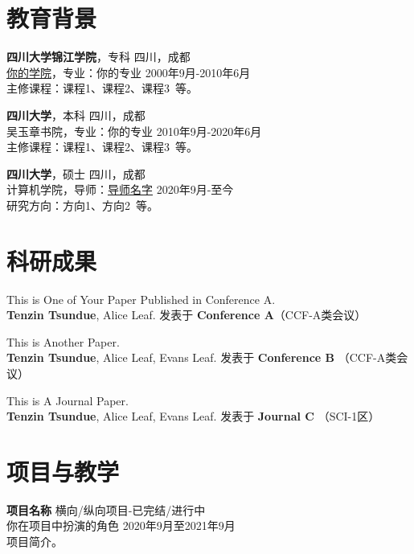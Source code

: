 \section{\makebox[\widthof{\faGraduationCap}][c]{\color{SCU_Red}{\faGraduationCap}}\quad 教育背景}
{\large \textbf{四川大学锦江学院}}，专科 \hfill {四川，成都} \\
\href{https://www.scu.edu.cn/}{你的学院}，专业：你的专业 \hfill {2000年9月-2010年6月} \\
主修课程：课程1、课程2、课程3\ 等。

\vspace{0.5em}
{\large \textbf{四川大学}}，本科 \hfill {四川，成都} \\
{{吴玉章书院}}，专业：你的专业 \hfill {2010年9月-2020年6月} \\
主修课程：课程1、课程2、课程3\ 等。

\vspace{0.5em}
{\large \textbf{四川大学}}，硕士 \hfill {四川，成都} \\
计算机学院，导师：\href{导师的个人主页.site}{导师名字} \hfill {2020年9月-至今} \\
研究方向：方向1、方向2\ 等。

\section{\makebox[\widthof{\faGraduationCap}][c]{\color{SCU_Red}{\faGraduationCap}}\quad 科研成果}
This is One of Your Paper Published in Conference A. \\
\textbf{Tenzin Tsundue}, Alice Leaf. \hfill 发表于 \textbf{Conference A}（CCF-A类会议） 

\vspace{0.5em}
This is Another Paper. \\
\textbf{Tenzin Tsundue}, Alice Leaf, Evans Leaf. \hfill 发表于 \textbf{Conference B} （CCF-A类会议）

\vspace{0.5em}
This is A Journal Paper. \\
\textbf{Tenzin Tsundue}, Alice Leaf, Evans Leaf. \hfill 发表于 \textbf{Journal C} （SCI-1区）

\section{\makebox[\widthof{\faChalkboardTeacher}][c]{\color{SCU_Red}{\faChalkboardTeacher}}\quad 项目与教学}
\vspace{0.5em}
{\large{\textbf{项目名称}}} \hfill {横向/纵向项目-已完结/进行中} \\
你在项目中扮演的角色 \hfill 2020年9月至2021年9月 \\
项目简介。

